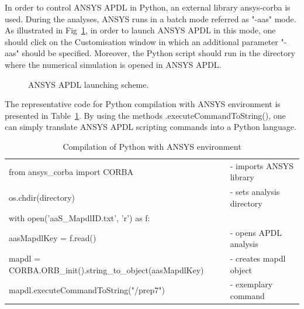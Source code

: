 
In order to control ANSYS APDL in Python, an external library ansys-corba is used. During the analyses, ANSYS runs in a batch mode referred as "-aas" mode. As illustrated in Fig~\ref{fig:ansys_apdl_launching_scheme}, in order to launch ANSYS APDL in this mode, one should click on the Customisation window in which an additional parameter "-aas" should be specified. Moreover, the Python script should run in the directory where the numerical simulation is opened in ANSYS APDL.

\begin{figure}[H]
    \centering
    \caption{ANSYS APDL launching scheme.}
    \label{fig:ansys_apdl_launching_scheme}
\end{figure}

The representative code for Python compilation with ANSYS environment is presented in Table~\ref{table:ansys_python_compilation}. By using the methods .executeCommandToString(), one can simply translate ANSYS APDL scripting commands into a Python language.

\begin{table}[H]
    \caption{Compilation of Python with ANSYS environment} 
    \vspace{-1em} 
    \fontsize{10}{10}
    \selectfont 
    \renewcommand{\arraystretch}{1}
    \begin{center}
    \begin{tabular}{ ll }  
    \hline  
        from ansys\_corba import CORBA & - imports ANSYS library \\
        os.chdir(directory) & - sets analysis directory\\
        with open('aaS\_MapdlID.txt', 'r') as f: \\ aasMapdlKey = f.read() & - opens APDL analysis \\
        mapdl = CORBA.ORB\_init().string\_to\_object(aasMapdlKey) & - creates mapdl object \\
    \hline
        mapdl.executeCommandToString("/prep7") & - exemplary command \\
     \end{tabular} 
    \end{center}  
     \label{table:ansys_python_compilation} 
 \end{table}
